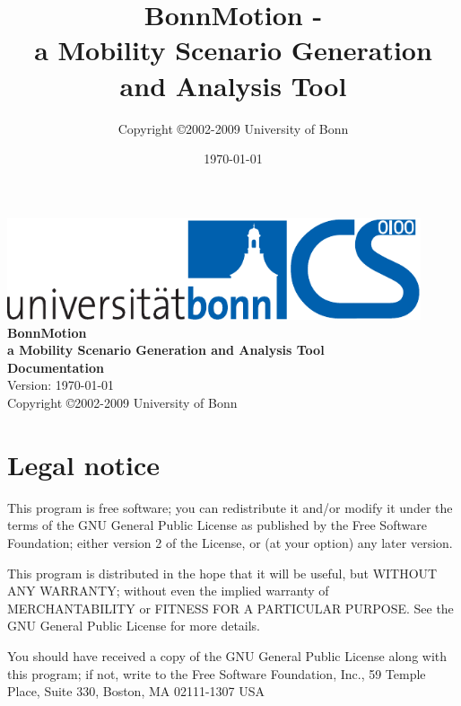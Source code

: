 \documentclass[11pt,a4paper,twoside,normalheadings,headsepline,DIV13,BCOR11mm,openright]{article}
\begin{document}
\title{BonnMotion -\\a Mobility Scenario Generation and Analysis Tool}
\author{Copyright \copyright  2002-2009 University of Bonn}
\date{\today}

	\thispagestyle{empty}
\begin{titlepage}
	\begin{center}

        \includegraphics[height=30mm]{logo}\\[45mm]
	
	\textbf{\Huge{BonnMotion}}\\[10mm]
        \textbf{\LARGE{a Mobility Scenario Generation and Analysis Tool}}\\[20mm]

	
        \textbf{\Large{Documentation}}\\[7mm]
	\Large{Version: \today}\\[45mm]

	\Large{Copyright \copyright  2002-2009 University of Bonn}\\[22mm]
		  
	\end{center}
\end{titlepage}

\tableofcontents

\clearpage

\section{Legal notice}

This  program is free software; you can redistribute it and/or modify it
under the terms of the GNU General Public License as  published  by  the
Free  Software  Foundation; either version 2 of the License, or (at your
option) any later version.

This program is distributed in the hope that  it  will  be  useful,  but
WITHOUT   ANY   WARRANTY;   without   even   the   implied  warranty  of
MERCHANTABILITY or FITNESS FOR A PARTICULAR PURPOSE. See the GNU General
Public License for more details.

You  should have received a copy of the GNU General Public License along
with this program; if not, write to the Free Software Foundation,  Inc.,
59 Temple Place, Suite 330, Boston, MA  02111-1307  USA
\end{document}
